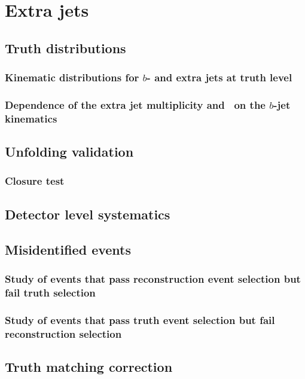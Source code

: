 \documentclass[12pt]{ucbthesis}
\begin{document}
\appendix
\chapter{Extra jets}
\section{Truth distributions}
\subsection{Kinematic distributions for $b$- and extra jets at truth level}
\label{app:truth}

\subsection{Dependence of the extra jet multiplicity and \pt\ on the $b$-jet kinematics}
\label{app:bpt}

\section{Unfolding validation}
\label{app:unfoldval}

\subsection{Closure test}
\label{app:unfoldpull}




\section{Detector level systematics}
\label{app:sys}


\section{Misidentified events}
\subsection{Study of  events that pass reconstruction event selection but fail truth selection}
\label{app:reconottruth}

\subsection{Study of events that pass truth event selection but fail reconstruction selection}
\label{app:truthnotreco}

\section{Truth matching correction}
\label{app:tcorr}

\end{document}
